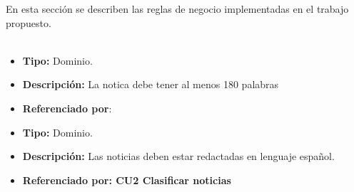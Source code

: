 

En esta sección se describen las reglas de negocio implementadas en el trabajo propuesto.\\\\


\begin{itemize}
  \item \textbf{Tipo:} Dominio. 
  \item \textbf{Descripción:}  La notica debe tener al menos 180 palabras
  \item \textbf{Referenciado por}: 
\end{itemize}


\begin{itemize}
  \item \textbf{Tipo:} Dominio.  
  \item \textbf{Descripción:} Las noticias deben estar redactadas en lenguaje español.
  \item \textbf{Referenciado por: CU2 Clasificar noticias}  \\
\end{itemize}

